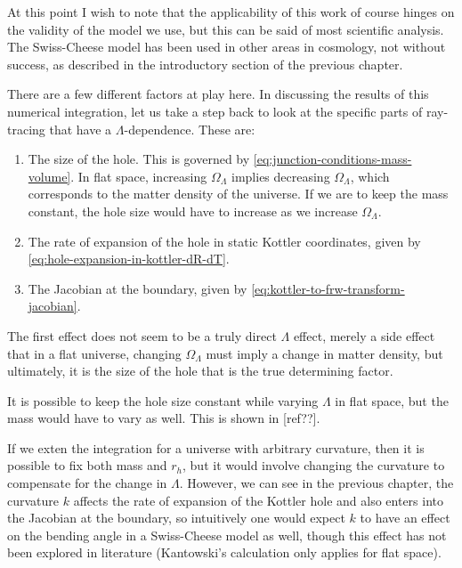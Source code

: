 At this point I wish to note that the applicability of this work of course hinges on the validity of the model we use, but this can be said of most scientific analysis. The Swiss-Cheese model has been used in other areas in cosmology, not without success, as described in the introductory section of the previous chapter.  

There are a few different factors at play here. In discussing the results of this numerical integration, let us take a step back to look at the specific parts of ray-tracing that have a $\Lambda$-dependence. These are:
\begin{enumerate}
  \item The size of the hole. This is governed by \autoref{eq:junction-conditions-mass-volume}. In flat space, increasing $\Omega_{\Lambda}$ implies decreasing $\Omega_{\Lambda}$, which corresponds to the matter density of the universe. If we are to keep the mass constant, the hole size would have to increase as we increase $\Omega_{\Lambda}$. 
  \item The rate of expansion of the hole in static Kottler coordinates, given by \autoref{eq:hole-expansion-in-kottler-dR-dT}.  
  \item The Jacobian at the boundary, given by \autoref{eq:kottler-to-frw-transform-jacobian}.
\end{enumerate}

The first effect does not seem to be a truly direct $\Lambda$ effect, merely a side effect that in a flat universe, changing $\Omega_{\Lambda}$ must imply a change in matter density, but ultimately, it is the size of the hole that is the true determining factor. 

It is possible to keep the hole size constant while varying $\Lambda$ in flat space, but the mass would have to vary as well. This is shown in [ref??]. 

If we exten the integration for a universe with arbitrary curvature, then it is possible to fix both mass and $r_h$, but it would involve changing the curvature to compensate for the change in $\Lambda$. However, we can see in the previous chapter, the curvature $k$ affects the rate of expansion of the Kottler hole and also enters into the Jacobian at the boundary, so intuitively one would expect $k$ to have an effect on the bending angle in a Swiss-Cheese model as well, though this effect has not been explored in literature (Kantowski's calculation \citet{kantowski2010gravitational} only applies for flat space). 

